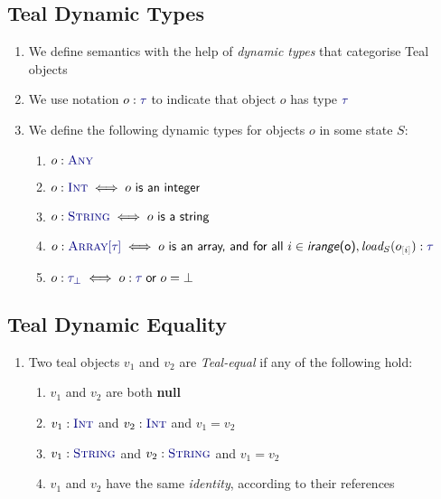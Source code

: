 \documentclass{article}
\newcommand{\Ty}[1]{\textcolor{dblue}{#1}}
\newcommand{\TString}{\Ty{\textsc{String}}}
\newcommand{\TInt}{\Ty{\textsc{Int}}}
\newcommand{\TAny}{\Ty{\textsc{Any}}}
\newcommand{\TArrayof}[1]{\Ty{\textsc{Array}[#1]}}
\newcommand{\Ttau}[1][{}]{\Ty{\tau_{#1}}}
\newcommand{\Vnull}[0]{\textbf{\textcolor{dcyan}{null}}}
\newcommand{\arrayindices}[1]{\textsf{\textit{irange}(#1)}}
\newcommand{\arrsub}[2]{#1_{\textcolor{gray}{[}#2\textcolor{gray}{]}}}
\begin{document}
\subsection{Teal Dynamic Types}
\begin{enumerate}
\item We define semantics with the help of \emph{dynamic types} that categorise Teal objects
\item We use notation $o : \Ttau$ to indicate that object $o$ has type $\Ttau$
\item We define the following dynamic types for objects $o$ in some state $S$:
  \begin{enumerate}
    \item $o : \TAny{}$
    \item $o : \TInt{} \iff o \textsf{ is an integer}$
    \item $o : \TString{} \iff o \textsf{ is a string}$
    \item $o : \TArrayof{\Ttau} \iff o \textsf{ is an array, and for all }i \in \arrayindices{o}, \textit{load}_S(\arrsub{o}{i}) : \Ttau$
    \item $o : \Ttau[\bot] \iff o : \Ttau \textsf{ or } o = \bot$
  \end{enumerate}
\end{enumerate}

\subsection{Teal Dynamic Equality}
\begin{enumerate}
\item Two teal objects $v_1$ and $v_2$ are \emph{Teal-equal} if any of the following hold:
  \begin{enumerate}
    \item $v_1$ and $v_2$ are both \Vnull
    \item $v_1 : \TInt$ and $v_2 : \TInt$ and $v_1 = v_2$
    \item $v_1 : \TString$ and $v_2 : \TString$ and $v_1 = v_2$
    \item $v_1$ and $v_2$ have the same \emph{identity}, according to their references
  \end{enumerate}
\end{enumerate}
\end{document}
